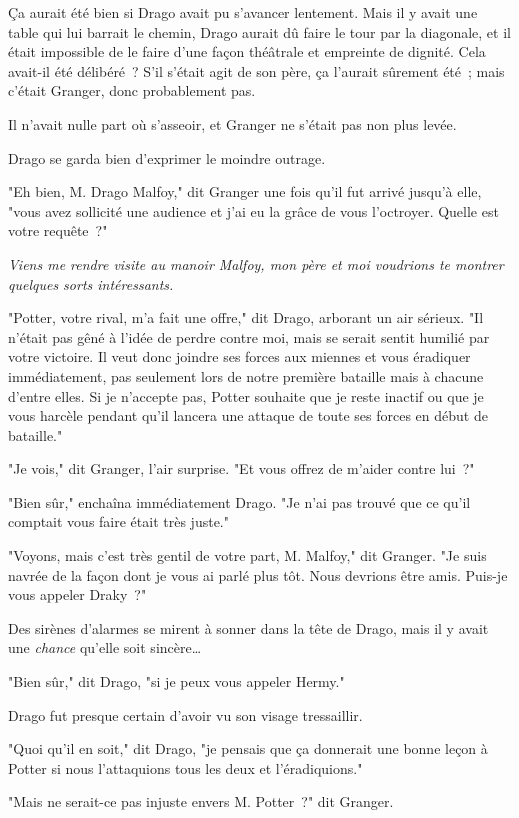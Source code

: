 Ça aurait été bien si Drago avait pu s'avancer lentement. Mais il y avait une table qui lui barrait le chemin, Drago aurait dû faire le tour par la diagonale, et il était impossible de le faire d'une façon théâtrale et empreinte de dignité. Cela avait-il été délibéré~? S'il s'était agit de son père, ça l'aurait sûrement été~; mais c'était Granger, donc probablement pas.

Il n'avait nulle part où s'asseoir, et Granger ne s'était pas non plus levée.

Drago se garda bien d'exprimer le moindre outrage.

"Eh bien, M. Drago Malfoy," dit Granger une fois qu'il fut arrivé jusqu'à elle, "vous avez sollicité une audience et j'ai eu la grâce de vous l'octroyer. Quelle est votre requête~?"

\emph{Viens me rendre visite au manoir Malfoy, mon père et moi voudrions te montrer quelques sorts intéressants.}

"Potter, votre rival, m'a fait une offre," dit Drago, arborant un air sérieux. "Il n'était pas gêné à l'idée de perdre contre moi, mais se serait sentit humilié par votre victoire. Il veut donc joindre ses forces aux miennes et vous éradiquer immédiatement, pas seulement lors de notre première bataille mais à chacune d'entre elles. Si je n'accepte pas, Potter souhaite que je reste inactif ou que je vous harcèle pendant qu'il lancera une attaque de toute ses forces en début de bataille."

"Je vois," dit Granger, l'air surprise. "Et vous offrez de m'aider contre lui~?"

"Bien sûr," enchaîna immédiatement Drago. "Je n'ai pas trouvé que ce qu'il comptait vous faire était très juste."

"Voyons, mais c'est très gentil de votre part, M. Malfoy," dit Granger. "Je suis navrée de la façon dont je vous ai parlé plus tôt. Nous devrions être amis. Puis-je vous appeler Draky~?"

Des sirènes d'alarmes se mirent à sonner dans la tête de Drago, mais il y avait une \emph{chance} qu'elle soit sincère…

"Bien sûr," dit Drago, "si je peux vous appeler Hermy."

Drago fut presque certain d'avoir vu son visage tressaillir.

"Quoi qu'il en soit," dit Drago, "je pensais que ça donnerait une bonne leçon à Potter si nous l'attaquions tous les deux et l'éradiquions."

"Mais ne serait-ce pas injuste envers M. Potter~?" dit Granger.

